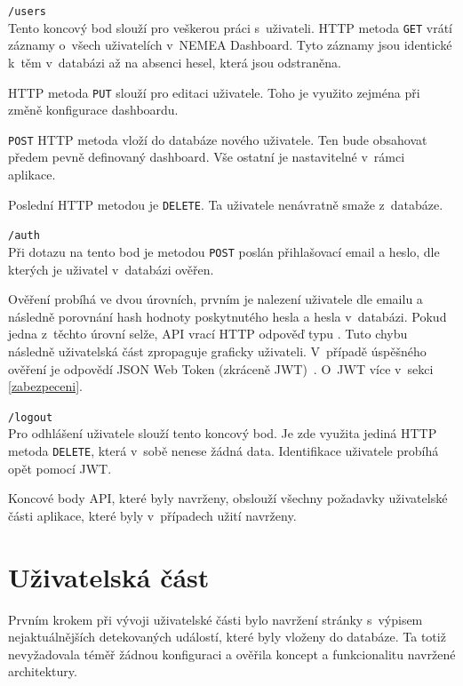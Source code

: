 \begin{description}
    \item \texttt{/users}\\
        Tento koncový bod slouží pro veškerou práci s~uživateli. HTTP metoda \texttt{GET} vrátí záznamy o~všech uživatelích v~NEMEA Dashboard. Tyto záznamy jsou identické k~těm v~databázi až na absenci hesel, která jsou odstraněna.

        HTTP metoda \texttt{PUT} slouží pro editaci uživatele. Toho je využito zejména při změně konfigurace dashboardu.

        \texttt{POST} HTTP metoda vloží do databáze nového uživatele. Ten bude obsahovat předem pevně definovaný dashboard. Vše ostatní je nastavitelné v~rámci aplikace.

        Poslední HTTP metodou je \texttt{DELETE}. Ta uživatele nenávratně smaže z~databáze.

    \item \texttt{/auth}\\
        Při dotazu na tento bod je metodou \texttt{POST} poslán přihlašovací email a heslo, dle kterých je uživatel v~databázi ověřen.

        Ověření probíhá ve dvou úrovních, prvním je nalezení uživatele dle emailu a následně porovnání hash hodnoty poskytnutého hesla a hesla v~databázi. Pokud jedna z~těchto úrovní selže, API vrací HTTP odpověď typu . Tuto chybu následně uživatelská část zpropaguje graficky uživateli. V~případě úspěšného ověření je odpovědí JSON Web Token (zkráceně JWT)~\cite{rfc:jwt}. O~JWT více v~sekci \ref{zabezpeceni}.

    \item \texttt{/logout}\\
        Pro odhlášení uživatele slouží tento koncový bod. Je zde využita jediná HTTP metoda \texttt{DELETE}, která v~sobě nenese žádná data. Identifikace uživatele probíhá opět pomocí JWT.
\end{description}

Koncové body API, které byly navrženy, obslouží všechny požadavky uživatelské části aplikace, které byly v~případech užití navrženy.

\section{Uživatelská část}

Prvním krokem při vývoji uživatelské části bylo navržení stránky s~výpisem nejaktuálnějších detekovaných událostí, které byly vloženy do databáze. Ta totiž nevyžadovala téměř žádnou konfiguraci a ověřila koncept a funkcionalitu navržené architektury.

